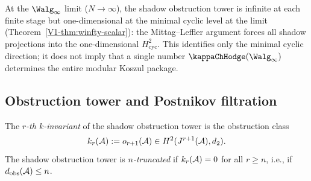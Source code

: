 \begin{remark}
At the $\Walg_\infty$ limit ($N \to \infty$), the
shadow obstruction tower is infinite at each finite stage but
one-dimensional at the minimal cyclic level at the limit
(Theorem~\ref{V1-thm:winfty-scalar}): the
Mittag--Leffler argument forces all shadow projections
into the one-dimensional $H^2_{\mathrm{cyc}}$.
This identifies only the minimal cyclic direction; it does not imply
that a single number $\kappaChHodge(\Walg_\infty)$ determines the entire
modular Koszul package.
\end{remark}


\subsection{Obstruction tower and Postnikov filtration}

\begin{definition}
The \emph{$r$-th $k$-invariant} of the shadow obstruction tower is
the obstruction class
\begin{equation}%
k_r(\cA) := o_{r+1}(\cA) \in H^2(J^{r+1}(\cA), d_2).
\end{equation}
The shadow obstruction tower is
\emph{$n$-truncated} if $k_r(\mathcal{A}) = 0$ for all
$r \geq n$, i.e., if \(d_{\mathrm{obs}}(\mathcal{A})\le n\).
\end{definition}

